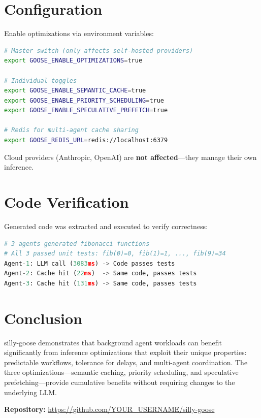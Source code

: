 \documentclass[11pt]{article}
\begin{document}
\section{Configuration}

Enable optimizations via environment variables:

\begin{lstlisting}[language=bash]
# Master switch (only affects self-hosted providers)
export GOOSE_ENABLE_OPTIMIZATIONS=true

# Individual toggles
export GOOSE_ENABLE_SEMANTIC_CACHE=true
export GOOSE_ENABLE_PRIORITY_SCHEDULING=true
export GOOSE_ENABLE_SPECULATIVE_PREFETCH=true

# Redis for multi-agent cache sharing
export GOOSE_REDIS_URL=redis://localhost:6379
\end{lstlisting}

Cloud providers (Anthropic, OpenAI) are \textbf{not affected}---they manage their own inference.

\section{Code Verification}

Generated code was extracted and executed to verify correctness:

\begin{lstlisting}[language=Python]
# 3 agents generated fibonacci functions
# All 3 passed unit tests: fib(0)=0, fib(1)=1, ..., fib(9)=34
Agent-1: LLM call (3083ms) -> Code passes tests
Agent-2: Cache hit (22ms)  -> Same code, passes tests
Agent-3: Cache hit (131ms) -> Same code, passes tests
\end{lstlisting}

\section{Conclusion}

silly-goose demonstrates that background agent workloads can benefit significantly from inference optimizations that exploit their unique properties: predictable workflows, tolerance for delays, and multi-agent coordination. The three optimizations---semantic caching, priority scheduling, and speculative prefetching---provide cumulative benefits without requiring changes to the underlying LLM.

\vspace{1em}
\noindent\textbf{Repository:} \url{https://github.com/YOUR_USERNAME/silly-goose}
\end{document}
